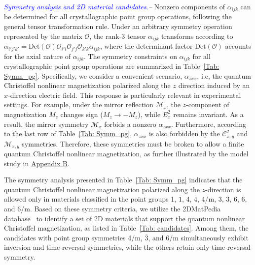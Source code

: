 \documentclass[aps,prl,twocolumn,amsmath,amssymb,showpacs, superscriptaddress,notitlepage,longbibliography,10pt]{revtex4-1}
\begin{document}
\textit{\textcolor{blue}{Symmetry analysis and 2D material candidates.}--} Nonzero components of $\alpha_{ijk}$ can be determined for all crystallographic point group operations, following the general tensor transformation rule. Under an arbitrary symmetry operation represented by the matrix $\mathcal{O}$, the rank-3 tensor $\alpha_{ijk}$ transforms according to $\alpha_{i'j'k'} = \text{Det}(\mathcal{O})\mathcal{O}_{i'i}\mathcal{O}_{j'j} \mathcal{O}_{k'k} \alpha_{ijk}$, where the determinant factor $\text{Det}(\mathcal{O})$ accounts for the axial nature of $\alpha_{ijk}$. The symmetry constraints on $\alpha_{ijk}$ for all crystallographic point group operations are summarized in Table~\ref{Tab: Symm_pg}. Specifically, we consider a convenient scenario, $\alpha_{zxx}$, i.e, the quantum Christoffel nonlinear magnetization polarized along the $z$ direction induced by an $x$-direction electric field. This response is particularly relevant in experimental settings. For example, under the mirror reflection $\mathcal{M}_x$, the $z$-component of magnetization $M_z$ changes sign ($M_z \rightarrow -M_z$), while $E_x^2$ remains invariant. As a result, the mirror symmetry $\mathcal{M}_x$ forbids a nonzero $\alpha_{zxx}$. Furthermore, according to the last row of Table~\ref{Tab: Symm_pg}, $\alpha_{zxx}$ is also forbidden by the $\mathcal{C}_{x,y}^2$ and $\mathcal{M}_{x,y}$ symmetries. Therefore, these symmetries must be broken to allow a finite quantum Christoffel nonlinear magnetization, as further illustrated by the model study in \hyperlink{Appendix B}{Appendix B}.


The symmetry analysis presented in Table~\ref{Tab: Symm_pg} indicates that the quantum Christoffel nonlinear magnetization polarized along the $z$-direction is allowed only in materials classified in the point groups 1, $\overline{1}$, 4, $\overline{4}$, 4/m, 3, $\overline{3}$, 6, $\overline{6}$, and 6/m. Based on these symmetry criteria, we utilize the 2DMatPedia database~\cite{2DMat} to identify a set of 2D materials that support the quantum nonlinear Christoffel magnetization, as listed in Table~\ref{Tab: candidates}. Among them, the candidates with point group symmetries 4/m, $\overline{3}$, and 6/m simultaneously exhibit inversion and time-reversal symmetries, while the others retain only time-reversal symmetry.
\end{document}
